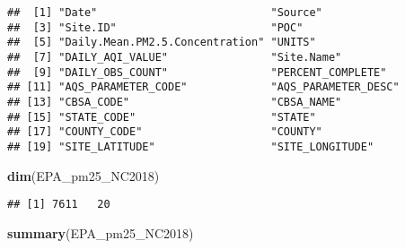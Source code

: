 \documentclass[]{article}
\newenvironment{Shaded}{\begin{snugshade}}{\end{snugshade}}
\newcommand{\KeywordTok}[1]{\textcolor[rgb]{0.13,0.29,0.53}{\textbf{#1}}}
\newcommand{\NormalTok}[1]{#1}
\begin{document}
\begin{verbatim}
##  [1] "Date"                           "Source"                        
##  [3] "Site.ID"                        "POC"                           
##  [5] "Daily.Mean.PM2.5.Concentration" "UNITS"                         
##  [7] "DAILY_AQI_VALUE"                "Site.Name"                     
##  [9] "DAILY_OBS_COUNT"                "PERCENT_COMPLETE"              
## [11] "AQS_PARAMETER_CODE"             "AQS_PARAMETER_DESC"            
## [13] "CBSA_CODE"                      "CBSA_NAME"                     
## [15] "STATE_CODE"                     "STATE"                         
## [17] "COUNTY_CODE"                    "COUNTY"                        
## [19] "SITE_LATITUDE"                  "SITE_LONGITUDE"
\end{verbatim}

\begin{Shaded}
\begin{Highlighting}[]
\KeywordTok{dim}\NormalTok{(EPA_pm25_NC2018)}
\end{Highlighting}
\end{Shaded}

\begin{verbatim}
## [1] 7611   20
\end{verbatim}

\begin{Shaded}
\begin{Highlighting}[]
\KeywordTok{summary}\NormalTok{(EPA_pm25_NC2018)}
\end{Highlighting}
\end{Shaded}
\end{document}
